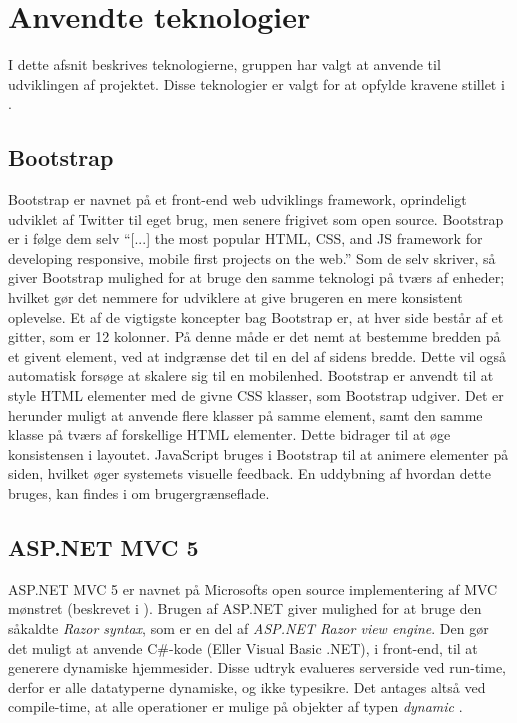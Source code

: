 \section{Anvendte teknologier}
I dette afsnit beskrives teknologierne, gruppen har valgt at anvende til udviklingen af projektet.
Disse teknologier er valgt for at opfylde kravene stillet i .

\subsection{Bootstrap}
Bootstrap er navnet på et front-end web udviklings framework, oprindeligt udviklet af Twitter til eget brug, men senere frigivet som open source.
Bootstrap er i følge dem selv ``[...] the most popular HTML, CSS, and JS framework for developing responsive, mobile first projects on the web.'' \cite{GETBOOTSTRAP}
Som de selv skriver, så giver Bootstrap mulighed for at bruge den samme teknologi på tværs af enheder; hvilket gør det nemmere for udviklere at give brugeren en mere konsistent oplevelse.
Et af de vigtigste koncepter bag Bootstrap er, at hver side består af et gitter, som er 12 kolonner.
På denne måde er det nemt at bestemme bredden på et givent element, ved at indgrænse det til en del af sidens bredde. 
Dette vil også automatisk forsøge at skalere sig til en mobilenhed.
Bootstrap er anvendt til at style HTML elementer med de givne CSS klasser, som Bootstrap udgiver.
Det er herunder muligt at anvende flere klasser på samme element, samt den samme klasse på tværs af forskellige HTML elementer.
Dette bidrager til at øge konsistensen i layoutet.
JavaScript bruges i Bootstrap til at animere elementer på siden, hvilket øger systemets visuelle feedback.
En uddybning af hvordan dette bruges, kan findes i  om brugergrænseflade. \cite{GETBOOTSTRAP}

\subsection{ASP.NET MVC 5}\label{aspnet}
ASP.NET MVC 5 er navnet på Microsofts open source implementering af MVC mønstret (beskrevet i ).
Brugen af ASP.NET giver mulighed for at bruge den såkaldte \textit{Razor syntax}, som er en del af \textit{ASP.NET Razor view engine}.
Den gør det muligt at anvende C\#-kode (Eller Visual Basic .NET), i front-end, til at generere dynamiske hjemmesider.
Disse udtryk evalueres serverside ved run-time, derfor er alle datatyperne dynamiske, og ikke typesikre.
Det antages altså ved compile-time, at alle operationer er mulige på objekter af typen \textit{dynamic} \citep{UsingTypeDynamic}.

